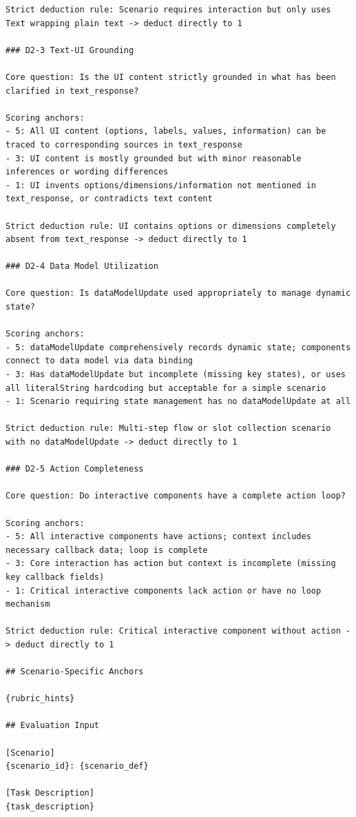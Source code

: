 \begin{verbatim}
Strict deduction rule: Scenario requires interaction but only uses Text wrapping plain text -> deduct directly to 1

### D2-3 Text-UI Grounding

Core question: Is the UI content strictly grounded in what has been clarified in text_response?

Scoring anchors:
- 5: All UI content (options, labels, values, information) can be traced to corresponding sources in text_response
- 3: UI content is mostly grounded but with minor reasonable inferences or wording differences
- 1: UI invents options/dimensions/information not mentioned in text_response, or contradicts text content

Strict deduction rule: UI contains options or dimensions completely absent from text_response -> deduct directly to 1

### D2-4 Data Model Utilization

Core question: Is dataModelUpdate used appropriately to manage dynamic state?

Scoring anchors:
- 5: dataModelUpdate comprehensively records dynamic state; components connect to data model via data binding
- 3: Has dataModelUpdate but incomplete (missing key states), or uses all literalString hardcoding but acceptable for a simple scenario
- 1: Scenario requiring state management has no dataModelUpdate at all

Strict deduction rule: Multi-step flow or slot collection scenario with no dataModelUpdate -> deduct directly to 1

### D2-5 Action Completeness

Core question: Do interactive components have a complete action loop?

Scoring anchors:
- 5: All interactive components have actions; context includes necessary callback data; loop is complete
- 3: Core interaction has action but context is incomplete (missing key callback fields)
- 1: Critical interactive components lack action or have no loop mechanism

Strict deduction rule: Critical interactive component without action -> deduct directly to 1

## Scenario-Specific Anchors

{rubric_hints}

## Evaluation Input

[Scenario]
{scenario_id}: {scenario_def}

[Task Description]
{task_description}


\end{verbatim}
